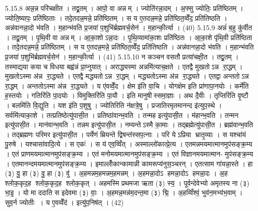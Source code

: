 5.15.8
अन्न॒न्न परि॑चक्षीत । तद्व्र॒तम् । आपो॒ वा अन्नम् । ज्योति॑रन्ना॒दम् । अ॒फ्सु ज्योतिः॒ प्रति॑ष्ठितम् । ज्योति॒ष्यापः॒ प्रति॑ष्ठिताः । तदे॒तदन्न॒मन्ने॒ प्रति॑ष्ठितम् । स य ए॒तदन्न॒मन्ने॒ प्रति॑ष्ठित॒व्वेँद॒ प्रति॑तिष्ठति । अन्न॑वानन्ना॒दो भ॑वति । म॒हान्भ॑वति प्र॒जया॑ प॒शुभि॑र्ब्रह्मवर्च॒सेन॑ । म॒हान्की॒र्त्या । (40)
5.15.9
अन्नं॑ ब॒हु कु॑र्वीत । तद्व्र॒तम् । पृ॒थि॒वी वा अन्नम् । आ॒का॒शोऽन्ना॒दः । पृ॒थि॒व्यामा॑का॒शः प्रति॑ष्ठितः । आ॒का॒शे पृ॑थि॒वी प्रति॑ष्ठिता । तदे॒तदन्न॒मन्ने॒ प्रति॑ष्ठितम् । स य ए॒तदन्न॒मन्ने॒ प्रति॑ष्ठित॒व्वेँद॒ प्रति॑तिष्ठति । अन्न॑वानन्ना॒दो भ॑वति । म॒हान्भ॑वति प्र॒जया॑ प॒शुभि॑र्ब्रह्मवर्च॒सेन॑ । म॒हान्की॒र्त्या । (41)
5.15.10
न कञ्चन वसतौ प्रत्या॑चक्षी॒त । तद्व्र॒तम् । तस्माद्यया कया च विधया बह्व॑न्नं प्रा॒प्नुयात् । अराद्ध्यस्मा अन्नमि॑त्याच॒क्षते । एतद्वै मुखतोऽन्न रा॒द्धम् । मुखतोऽस्मा अ॑न्न रा॒द्ध्यते । एतद्वै मद्ध्यतोऽन्न रा॒द्धम् । मद्ध्यतोऽस्मा अ॑न्न रा॒द्ध्यते । एतद्वा अन्ततोऽन्न रा॒द्धम् । अन्ततोऽस्मा अ॑न्न रा॒द्ध्यते । य ए॑वव्वेँ॒द । क्षेम इ॑ति वा॒चि । योगक्षेम इति प्रा॑णापा॒नयोः । कर्मे॑ति ह॒स्तयोः । गतिरि॑ति पा॒दयोः । विमुक्तिरि॑ति पा॒यौ । इति मानुषीस्समा॒ज्ञाः । अथ दै॒वीः । तृप्तिरि॑ति वृ॒ष्टौ । बलमि॑ति वि॒द्युति । यश इ॑ति प॒शुषु । ज्योतिरिति न॑क्षत्रे॒षु । प्रजातिरमृतमानन्द इ॑त्युप॒स्थे । सर्वमि॑त्याका॒शे । तत्प्रतिष्ठेत्यु॑पासी॒त । प्रतिष्ठा॑वान्भ॒वति । तन्मह इत्यु॑पासी॒त । म॑हान्भ॒वति । तन्मन इत्यु॑पासी॒त । मान॑वान्भ॒वति । तन्नम इत्यु॑पासी॒त । नम्यन्तेऽस्मै का॒माः । तद्ब्रह्मेत्यु॑पासी॒त । ब्रह्म॑वान्भ॒वति । तद्ब्रह्मणः परिमर इत्यु॑पासी॒त । पर्येणं म्रियन्ते द्विषन्त॑स्सप॒त्नाः । परि येऽप्रिया भ्रातृ॒व्याः । स यश्चा॑यं पु॒रुषे । यश्चासा॑वादि॒त्ये । स एकः॑ । स य॑ एव॒व्विँत् । अस्माल्लो॑कात्प्रे॒त्य । एतमन्नमयमात्मानमुप॑सङ्क्र॒म्य । एतं प्राणमयमात्मानमुप॑सङ्क्र॒म्य । एतं मनोमयमात्मानमुप॑सङ्क्र॒म्य । एतं विज्ञानमयमात्मान- मुप॑सङ्क्र॒म्य । एतमानन्दमयमात्मानमुप॑सङ्क्र॒म्य । इमाल्लोँकान्कामान्नी कामरूप्य॑नुस॒ञ्चरन् । एतत्साम गा॑यन्ना॒स्ते । हा (३) वु॒ हा (३) वु॒ हा (३) वु॑ । अ॒हमन्नम॒हमन्नम॒हमन्नम् । अ॒हमन्ना॒दोऽ हमन्ना॒दोऽ हमन्ना॒दः । अ॒ह श्लोक॒कृद॒ह श्लोक॒कृद॒ह श्लोक॒कृत् । अहमस्मि प्रथमजा ऋता (३) स्य॒ । पूर्वन्देवेभ्यो अमृतस्य ना (३) भा॒इ॒ । यो मा ददाति स इदेवमा (३) वाः॒ । अ॒हमन्न॒मन्न॑म॒दन्त॒मा (३) द्मि॒ । अ॒हव्विँश्वं॒ भुव॑न॒मभ्य॑भ॒वाम् । सुव॒र्न ज्योतीः । य ए॒वव्वेँद॑ । इत्यु॑प॒निष॑त् । (42)

